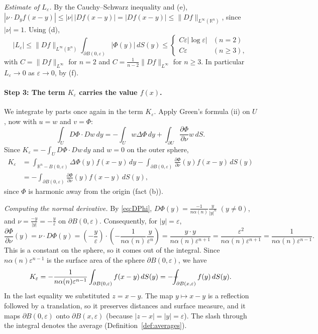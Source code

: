 \documentclass[11pt]{article}
\def\Xint#1{\mathchoice
  {\XXint\displaystyle\textstyle{#1}}%
  {\XXint\textstyle\scriptstyle{#1}}%
  {\XXint\scriptstyle\scriptscriptstyle{#1}}%
  {\XXint\scriptscriptstyle\scriptscriptstyle{#1}}%
  \!\int}
\def\XXint#1#2#3{{\setbox0=\hbox{$#1{#2#3}{\int}$}
  \vcenter{\hbox{$#2#3$}}\kern-.5\wd0}}
\def\fint{\Xint-}
\theoremstyle{plain}
\theoremstyle{definition}
\theoremstyle{remark}
\begin{document}
\textit{Estimate of $L_\varepsilon$.} By the Cauchy--Schwarz inequality and (e), $\left|\nu \cdot D_y f(x-y)\right| \leq |\nu|\,|Df(x-y)| = |Df(x-y)| \leq \|Df\|_{L^\infty(\mathbb{R}^n)}$, since $|\nu| = 1$. Using (d),
\begin{equation}\label{eq:L}
|L_\varepsilon| \leq \|Df\|_{L^\infty(\mathbb{R}^n)} \int_{\partial B(0,\varepsilon)} |\Phi(y)|\, dS(y) \leq \begin{cases} C\varepsilon|\log\varepsilon| & (n=2) \\ C\varepsilon & (n\geq 3), \end{cases}
\end{equation}
with $C = \|Df\|_{L^\infty}$ for $n=2$ and $C = \frac{1}{n-2}\|Df\|_{L^\infty}$ for $n \geq 3$. In particular $L_\varepsilon \to 0$ as $\varepsilon \to 0$, by (f).

\paragraph{Step 3: The term $K_\varepsilon$ carries the value $f(x)$.} We integrate by parts once again in the term $K_\varepsilon$. Apply Green's formula (ii) on $U$, now with $u = w$ and $v = \Phi$:
$$ \int_U D\Phi \cdot Dw\, dy = -\int_U w\Delta\Phi\, dy + \int_{\partial U}\frac{\partial\Phi}{\partial\nu} w\, dS. $$
Since $K_\varepsilon = -\int_U D\Phi\cdot Dw\, dy$ and $w = 0$ on the outer sphere,
\begin{align*}
K_\varepsilon &= \int_{\mathbb{R}^n - B(0,\varepsilon)} \Delta\Phi(y) f(x-y)\, dy - \int_{\partial B(0,\varepsilon)}\frac{\partial\Phi}{\partial\nu}(y) f(x-y)\, dS(y) \\
&= -\int_{\partial B(0,\varepsilon)}\frac{\partial\Phi}{\partial\nu}(y) f(x-y)\, dS(y),
\end{align*}
since $\Phi$ is harmonic away from the origin (fact (b)).

\textit{Computing the normal derivative.} By \eqref{eq:DPhi}, $D\Phi(y) = \frac{-1}{n\alpha(n)}\frac{y}{|y|^n}$ $(y \neq 0)$, and $\nu = \frac{-y}{|y|} = -\frac{y}{\varepsilon}$ on $\partial B(0,\varepsilon)$. Consequently, for $|y| = \varepsilon$,
$$ \frac{\partial\Phi}{\partial\nu}(y) = \nu\cdot D\Phi(y) = \left(-\frac{y}{\varepsilon}\right)\cdot\left(-\frac{1}{n\alpha(n)}\frac{y}{\varepsilon^n}\right) = \frac{y\cdot y}{n\alpha(n)\varepsilon^{n+1}} = \frac{\varepsilon^2}{n\alpha(n)\varepsilon^{n+1}} = \frac{1}{n\alpha(n)\varepsilon^{n-1}}. $$
This is a constant on the sphere, so it comes out of the integral. Since $n\alpha(n)\varepsilon^{n-1}$ is the surface area of the sphere $\partial B(0,\varepsilon)$, we have
\begin{equation}\label{eq:K}
K_\varepsilon = -\frac{1}{n\alpha(n)\varepsilon^{n-1}}\int_{\partial B(0,\varepsilon)} f(x-y)\, dS(y) = -\fint_{\partial B(x,\varepsilon)} f(y)\, dS(y).
\end{equation}
In the last equality we substituted $z = x - y$. The map $y \mapsto x - y$ is a reflection followed by a translation, so it preserves distances and surface measure, and it maps $\partial B(0,\varepsilon)$ onto $\partial B(x,\varepsilon)$ (because $|z - x| = |y| = \varepsilon$). The slash through the integral denotes the average (Definition~\ref{def:averages}).
\end{document}
